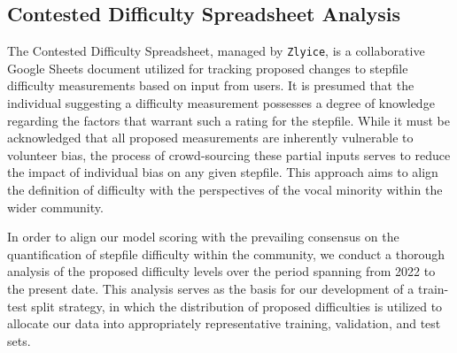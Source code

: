 \subsection{Contested Difficulty Spreadsheet Analysis}

The Contested Difficulty Spreadsheet, managed by \texttt{Zlyice}, is a collaborative Google Sheets document utilized for tracking proposed changes to stepfile difficulty measurements based on input from users. It is presumed that the individual suggesting a difficulty measurement possesses a degree of knowledge regarding the factors that warrant such a rating for the stepfile. While it must be acknowledged that all proposed measurements are inherently vulnerable to volunteer bias, the process of crowd-sourcing these partial inputs serves to reduce the impact of individual bias on any given stepfile. This approach aims to align the definition of difficulty with the perspectives of the vocal minority within the wider community.

\vspace{2mm}


In order to align our model scoring with the prevailing consensus on the quantification of stepfile difficulty within the community, we conduct a thorough analysis of the proposed difficulty levels over the period spanning from 2022 to the present date. This analysis serves as the basis for our development of a train-test split strategy, in which the distribution of proposed difficulties is utilized to allocate our data into appropriately representative training, validation, and test sets.